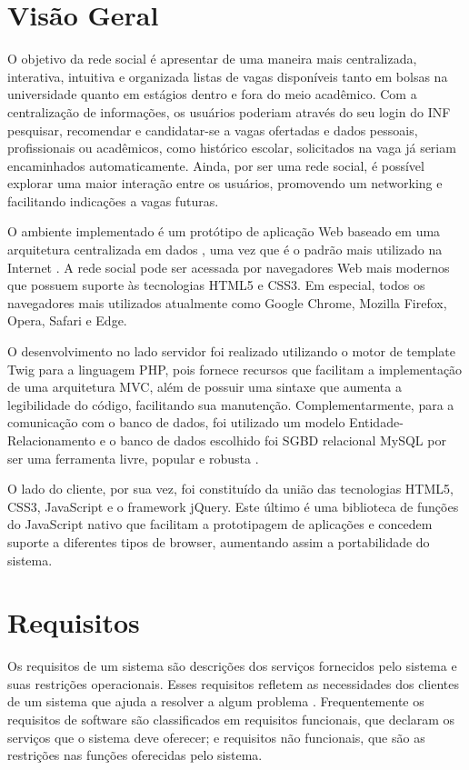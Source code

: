 \documentclass[cic,tc]{iiufrgs}
\begin{document}
\section{Visão Geral}
\label{metodologiaVisaoGeral}
O objetivo da rede social é apresentar de uma maneira mais centralizada, interativa, intuitiva e organizada listas de vagas disponíveis tanto em bolsas na universidade quanto em estágios dentro e fora do meio acadêmico. Com a centralização de informações, os usuários poderiam através do seu login do INF pesquisar, recomendar e candidatar-se a vagas ofertadas e dados pessoais, profissionais ou acadêmicos, como histórico escolar, solicitados na vaga já seriam encaminhados automaticamente. Ainda, por ser uma rede social, é possível explorar uma maior interação entre os usuários, promovendo um networking e facilitando indicações a vagas futuras.

O ambiente implementado é um protótipo de aplicação Web baseado em uma arquitetura centralizada em dados \cite{pressman}, uma vez que é o padrão mais utilizado na Internet \cite{kurose}. A rede social pode ser acessada por navegadores Web mais modernos que possuem suporte às tecnologias HTML5 e CSS3. Em especial, todos os navegadores mais utilizados atualmente como Google Chrome, Mozilla Firefox, Opera, Safari e Edge.

O desenvolvimento no lado servidor foi realizado utilizando o motor de template Twig para a linguagem PHP, pois fornece recursos que facilitam a implementação de uma arquitetura MVC, além de possuir uma sintaxe que aumenta a legibilidade do código, facilitando sua manutenção. Complementarmente, para a comunicação com o banco de dados, foi utilizado um modelo Entidade-Relacionamento e o banco de dados escolhido foi SGBD relacional MySQL por ser uma ferramenta livre, popular e robusta \cite{mysql}.

O lado do cliente, por sua vez, foi constituído da união das tecnologias HTML5, CSS3, JavaScript e o framework jQuery. Este último é uma biblioteca de funções do JavaScript nativo que facilitam a prototipagem de aplicações e concedem suporte a diferentes tipos de browser, aumentando assim a portabilidade do sistema.


\section{Requisitos}
\label{metodologiaRequisitos}
Os requisitos de um sistema são descrições dos serviços fornecidos pelo sistema e suas restrições operacionais. Esses requisitos refletem as necessidades dos clientes de um sistema que ajuda a resolver a algum problema \cite{sommerville}. Frequentemente os requisitos de software são classificados em requisitos funcionais, que declaram os serviços que o sistema deve oferecer; e requisitos não funcionais, que são as restrições nas funções oferecidas pelo sistema. 
\end{document}
